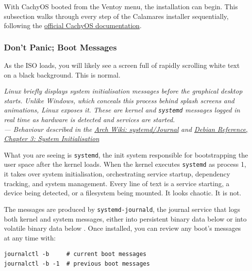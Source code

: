 \documentclass{article}
\newcommand{\code}[1]{\colorbox{codebg}{\texttt{#1}}}
\begin{document}
With CachyOS booted from the Ventoy menu, the installation can begin. This subsection walks through every step of the Calamares installer sequentially, following the
\href{https://wiki.cachyos.org}{official CachyOS documentation}.

\subsubsection{Don't Panic; Boot Messages}

As the ISO loads, you will likely see a screen full of rapidly scrolling white text on a black background. This is normal.  

\begin{mdframed}[linewidth=1.5pt, linecolor=black!50, topline=true, bottomline=true,
  leftline=false, rightline=false, backgroundcolor=black!3]
  \small\itshape
  Linux briefly displays system initialisation messages before the graphical desktop
  starts. Unlike Windows, which conceals this process behind splash screens and
  animations, Linux exposes it. These are kernel and \code{systemd} messages logged
  in real time as hardware is detected and services are started.\\[4pt]
  \normalfont\small --- Behaviour described in the
  \href{https://wiki.archlinux.org/title/Systemd/Journal}{Arch Wiki: systemd/Journal}
  and \href{https://www.debian.org/doc/manuals/debian-reference/ch03.en.html}{Debian
  Reference, Chapter 3: System Initialisation}
\end{mdframed}

\noindent What you are seeing is \code{systemd}, the init system responsible for bootstrapping the user space after the kernel loads. When the kernel executes \code{systemd} as process 1, it takes over system initialisation,
orchestrating service startup, dependency tracking, and system management. Every line of text is a service starting, a device being detected, or a filesystem
being mounted. It looks chaotic. It is not.

The messages are produced by \code{systemd-journald}, the journal service that
logs both kernel and system messages, either into persistent binary
data below  or into volatile binary data below
. Once installed, you can review any boot's
messages at any time with: \begin{verbatim}
journalctl -b     # current boot messages
journalctl -b -1  # previous boot messages
\end{verbatim}
\end{document}

